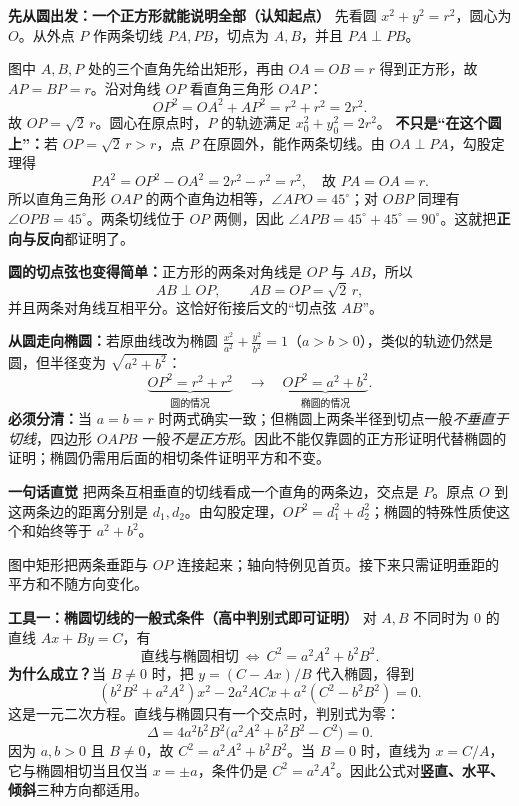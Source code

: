 \begin{explanationbox}
  \textbf{\textcolor{CExplanation}{先从圆出发：一个正方形就能说明全部（认知起点）}}
  先看圆 $x^2+y^2=r^2$，圆心为 $O$。从外点 $P$ 作两条切线 $PA,PB$，切点为 $A,B$，并且 $PA\perp PB$。
  
  图中 $A,B,P$ 处的三个直角先给出矩形，再由 $OA=OB=r$ 得到正方形，故 $AP=BP=r$。沿对角线 $OP$ 看直角三角形 $OAP$：
      \[
        OP^2=OA^2+AP^2=r^2+r^2=2r^2.
      \]
      故 $\boxed{OP=\sqrt2\,r}$。圆心在原点时，$P$ 的轨迹满足 $\boxed{x_0^2+y_0^2=2r^2}$。
  \textbf{不只是“在这个圆上”：}若 $OP=\sqrt2\,r>r$，点 $P$ 在原圆外，能作两条切线。由 $OA\perp PA$，勾股定理得
  \[
    PA^2=OP^2-OA^2=2r^2-r^2=r^2,
    \quad\text{故 }PA=OA=r.
  \]
  所以直角三角形 $OAP$ 的两个直角边相等，$\angle APO=45^\circ$；对 $OBP$ 同理有 $\angle OPB=45^\circ$。两条切线位于 $OP$ 两侧，因此
  $\angle APB=45^\circ+45^\circ=90^\circ$。这就把\textbf{正向与反向}都证明了。

  \textbf{圆的切点弦也变得简单：}正方形的两条对角线是 $OP$ 与 $AB$，所以
  \[
    \boxed{AB\perp OP},\qquad \boxed{AB=OP=\sqrt2\,r},
  \]
  并且两条对角线互相平分。这恰好衔接后文的“切点弦 $AB$”。

  \textbf{从圆走向椭圆：}若原曲线改为椭圆 $\frac{x^2}{a^2}+\frac{y^2}{b^2}=1$（$a>b>0$），类似的轨迹仍然是圆，但半径变为 $\sqrt{a^2+b^2}$：
  \[
    \underbrace{OP^2=r^2+r^2}_{\text{圆的情况}}
    \quad\longrightarrow\quad
    \underbrace{OP^2=a^2+b^2}_{\text{椭圆的情况}}.
  \]
  \textbf{必须分清：}当 $a=b=r$ 时两式确实一致；但椭圆上两条半径到切点一般\emph{不垂直于切线}，四边形 $OAPB$ 一般\emph{不是正方形}。因此不能仅靠圆的正方形证明代替椭圆的证明；椭圆仍需用后面的相切条件证明平方和不变。

  \medskip

  \textbf{\textcolor{CExplanation}{一句话直觉}}
  把两条互相垂直的切线看成一个直角的两条边，交点是 $P$。原点 $O$ 到这两条边的距离分别是 $d_1,d_2$。由勾股定理，$OP^2=d_1^2+d_2^2$；椭圆的特殊性质使这个和始终等于 $a^2+b^2$。

  \medskip


  图中矩形把两条垂距与 $OP$ 连接起来；轴向特例见首页。接下来只需证明垂距的平方和不随方向变化。

  \medskip
  \textbf{\textcolor{CExplanation}{工具一：椭圆切线的一般式条件（高中判别式即可证明）}}
  对 $A,B$ 不同时为 $0$ 的直线 $Ax+By=C$，有
  \[
    \boxed{\text{直线与椭圆相切}\ \Longleftrightarrow\ C^2=a^2A^2+b^2B^2.}
  \]
  \textbf{为什么成立？}当 $B\ne0$ 时，把 $y=(C-Ax)/B$ 代入椭圆，得到
  \[
    (b^2B^2+a^2A^2)x^2-2a^2ACx+a^2(C^2-b^2B^2)=0.
  \]
  这是一元二次方程。直线与椭圆只有一个交点时，判别式为零：
  \[
    \Delta=4a^2b^2B^2\bigl(a^2A^2+b^2B^2-C^2\bigr)=0.
  \]
  因为 $a,b>0$ 且 $B\ne0$，故 $C^2=a^2A^2+b^2B^2$。当 $B=0$ 时，直线为 $x=C/A$，它与椭圆相切当且仅当 $x=\pm a$，条件仍是 $C^2=a^2A^2$。因此公式对\textbf{竖直、水平、倾斜}三种方向都适用。


\end{explanationbox}
